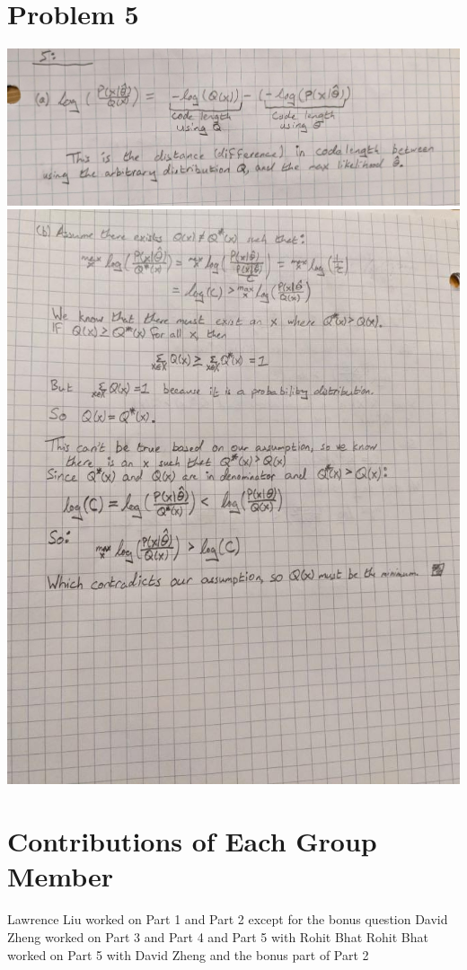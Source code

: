 \section*{Problem 5}
\includegraphics[scale=0.25]{"Part5/5a.jpg"}
\includegraphics[scale=0.5]{"Part5/5b.jpg"}
\section*{Contributions of Each Group Member}
Lawrence Liu worked on Part 1 and Part 2 except for the bonus question
David Zheng worked on Part 3 and Part 4 and Part 5 with Rohit Bhat
Rohit Bhat worked on Part 5 with David Zheng and the bonus part of Part 2
